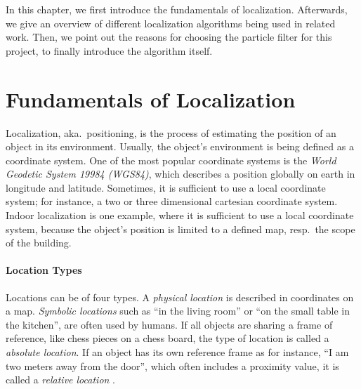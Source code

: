 In this chapter, we first introduce the fundamentals of localization. Afterwards, we give an overview of different localization algorithms being used in related work. Then, we point out the reasons for choosing the particle filter for this project, to finally introduce the algorithm itself.

\section{Fundamentals of Localization}

Localization, aka.\ positioning, is the process of estimating the position of an object in its environment. Usually, the object's environment is being defined as a coordinate system. One of the most popular coordinate systems is the \emph{World Geodetic System 19984 (WGS84)}, which describes a position globally on earth in longitude and latitude. Sometimes, it is sufficient to use a local coordinate system; for instance, a two or three dimensional cartesian coordinate system. Indoor localization is one example, where it is sufficient to use a local coordinate system, because the object's position is limited to a defined map, resp.\ the scope of the building.

\paragraph{Location Types}
Locations can be of four types. A \emph{physical location} is described in coordinates on a map. \emph{Symbolic locations} such as ``in the living room'' or ``on the small table in the kitchen'', are often used by humans. If all objects are sharing a frame of reference, like chess pieces on a chess board, the type of location is called a \emph{absolute location}. If an object has its own reference frame as for instance, ``I am two meters away from the door'', which often includes a proximity value, it is called a \emph{relative location} \citep{IEEE:survey_wireless_indoor_pos}.


